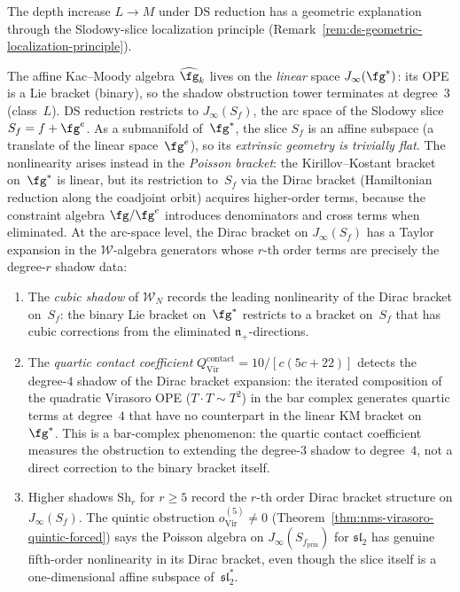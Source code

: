 \begin{remark}
\label{rem:ds-depth-increase-geometric}
The depth increase $L \to M$ under DS reduction has a geometric
explanation through the Slodowy-slice localization principle
(Remark~\ref{rem:ds-geometric-localization-principle}).

The affine Kac--Moody algebra $\widehat{\fg}_k$ lives on the
\emph{linear} space $J_\infty(\fg^*)$: its OPE is a Lie bracket
(binary), so the shadow obstruction tower terminates at degree~$3$ (class~$L$).
DS reduction restricts to $J_\infty(S_f)$, the arc space of the
Slodowy slice $S_f = f + \fg^e$. As a submanifold of~$\fg^*$,
the slice $S_f$ is an affine subspace (a translate of the linear
space~$\fg^e$), so its \emph{extrinsic geometry is trivially flat}.
The nonlinearity arises instead in the \emph{Poisson bracket}:
the Kirillov--Kostant bracket on~$\fg^*$ is linear, but its
restriction to~$S_f$ via the Dirac bracket (Hamiltonian reduction
along the coadjoint orbit) acquires higher-order terms, because
the constraint algebra $\fg / \fg^e$ introduces denominators and
cross terms when eliminated. At the arc-space level, the Dirac
bracket on $J_\infty(S_f)$ has a Taylor expansion in the
$\mathcal{W}$-algebra generators whose $r$-th order terms are
precisely the degree-$r$ shadow data:
\begin{enumerate}[label=\textup{(\roman*)}]
\item The \emph{cubic shadow} of $\mathcal{W}_N$ records the
 leading nonlinearity of the Dirac bracket on~$S_f$: the
 binary Lie bracket on~$\fg^*$ restricts to a bracket on~$S_f$
 that has cubic corrections from the eliminated
 $\mathfrak{n}_+$-directions.
\item The \emph{quartic contact coefficient}
 $Q^{\mathrm{contact}}_{\mathrm{Vir}} = 10/[c(5c+22)]$
 detects the degree-$4$ shadow of the Dirac bracket expansion:
 the iterated composition of the quadratic Virasoro OPE
 ($T \cdot T \sim T^2$) in the bar complex generates quartic terms
 at degree~$4$ that have no
 counterpart in the linear KM bracket on~$\fg^*$.
 This is a bar-complex phenomenon: the quartic contact coefficient
 measures the obstruction to extending the degree-$3$ shadow to
 degree~$4$, not a direct correction to the binary bracket itself.
\item Higher shadows $\mathrm{Sh}_r$ for $r \geq 5$ record the
 $r$-th order Dirac bracket structure on $J_\infty(S_f)$.
 The quintic obstruction $o^{(5)}_{\mathrm{Vir}} \neq 0$
 (Theorem~\ref{thm:nms-virasoro-quintic-forced}) says the
 Poisson algebra on $J_\infty(S_{f_{\mathrm{prin}}})$ for
 $\mathfrak{sl}_2$ has genuine fifth-order nonlinearity
 in its Dirac bracket, even though the slice itself is a
 one-dimensional affine subspace of~$\mathfrak{sl}_2^*$.
\end{enumerate}


\end{remark}
